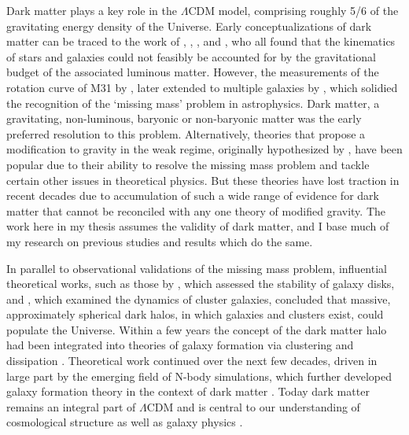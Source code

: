 Dark matter plays a key role in the $\Lambda$CDM model, comprising roughly 5/6 of the gravitating energy density of the Universe. Early conceptualizations of dark matter can be traced to the work of \textcite{kapteyn1922}, \textcite{oort32}, \textcite{zwicky33}, and \textcite{babcock39}, who all found that the kinematics of stars and galaxies could not feasibly be accounted for by the gravitational budget of the associated luminous matter. However, the measurements of the rotation curve of M31 by \textcite{rubin70}, later extended to multiple galaxies by \textcite{rubin80}, which solidied the recognition of the `missing mass' problem in astrophysics. Dark matter, a gravitating, non-luminous, baryonic or non-baryonic matter was the early preferred resolution to this problem. Alternatively, theories that propose a modification to gravity in the weak regime, originally hypothesized by \textcite{milgrom83}, have been popular due to their ability to resolve the missing mass problem and tackle certain other issues in theoretical physics. But these theories have lost traction in recent decades due to accumulation of such a wide range of evidence for dark matter that cannot be reconciled with any one theory of modified gravity. The work here in my thesis assumes the validity of dark matter, and I base much of my research on previous studies and results which do the same.

In parallel to observational validations of the missing mass problem, influential theoretical works, such as those by \textcite{ostriker73}, which assessed the stability of galaxy disks, and \textcite{einasto74}, which examined the dynamics of cluster galaxies, concluded that massive, approximately spherical dark halos, in which galaxies and clusters exist, could populate the Universe. Within a few years the concept of the dark matter halo had been integrated into theories of galaxy formation via clustering and dissipation \parencite{white78}. Theoretical work continued over the next few decades, driven in large part by the emerging field of N-body simulations, which further developed galaxy formation theory in the context of dark matter \parencite{white91}. Today dark matter remains an integral part of $\Lambda$CDM and is central to our understanding of cosmological structure as well as galaxy physics \parencite[e.g.][]{frenk12}.

